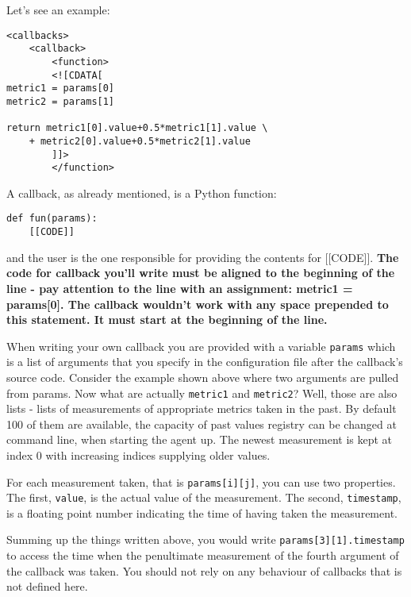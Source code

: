 \documentclass[a4paper,twoside,11pt]{article}
\begin{document}
			Let's see an example:
			\begin{Verbatim}
<callbacks>
	<callback>
		<function>
		<![CDATA[
metric1 = params[0]
metric2 = params[1]

return metric1[0].value+0.5*metric1[1].value \
	+ metric2[0].value+0.5*metric2[1].value
		]]>
		</function>
			\end{Verbatim}

   			A callback, as already mentioned, is a Python function:
			\begin{Verbatim}
def fun(params):
	[[CODE]]
			\end{Verbatim}
			and the user is the one responsible for providing the contents for [[CODE]]. \textbf{The code for callback you'll write must be aligned to the beginning of the line - pay attention to the line with an assignment: metric1 = params[0]. The callback wouldn't work with any space prepended to this statement. It must start at the beginning of the line.}

			When writing your own callback you are provided with a variable \texttt{params} which is a list of arguments that you specify in the configuration file after the callback's source code. Consider the example shown above where two arguments are pulled from params. Now what are actually \texttt{metric1} and \texttt{metric2}? Well, those are also lists - lists of measurements of appropriate metrics taken in the past. By default 100 of them are available, the capacity of past values registry can be changed at command line, when starting the agent up. The newest measurement is kept at index 0 with increasing indices supplying older values.

			For each measurement taken, that is \texttt{params[i][j]}, you can use two properties. The first, \texttt{value}, is the actual value of the measurement. The second, \texttt{timestamp}, is a floating point number indicating the time of having taken the measurement.

			Summing up the things written above, you would write \texttt{params[3][1].timestamp} to access the time when the penultimate measurement of the fourth argument of the callback was taken. You should not rely on any behaviour of callbacks that is not defined here.
\end{document}
